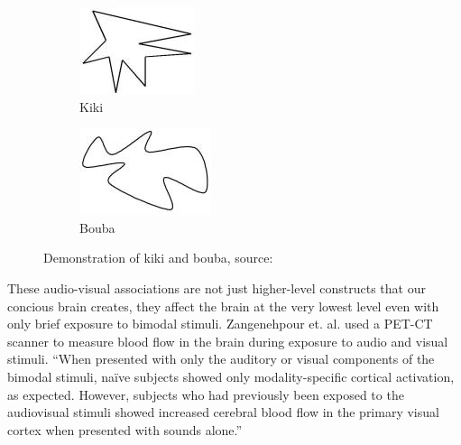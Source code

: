 \begin{figure}[ht]
\centering
\begin{subfigure}{.5\textwidth}
  \centering
  \includegraphics[width=0.7\linewidth]{figs/kiki.png}
  \caption{Kiki}
  \label{fig:kiki}
\end{subfigure}%
\begin{subfigure}{.5\textwidth}
  \centering
  \includegraphics[width=0.7\linewidth]{figs/bouba.png}
  \caption{Bouba}
  \label{fig:bouba}
\end{subfigure}
  \caption{Demonstration of kiki and bouba, source: \citep{Ramachandran2001}}
  \label{fig:boubakiki}
\end{figure}

These audio-visual associations are not just higher-level constructs that our
concious brain creates, they affect the brain at the very lowest level even
with only brief exposure to bimodal stimuli. Zangenehpour et. al.
\citep{Zangenehpour2010} used a PET-CT scanner to measure blood flow in the
brain during exposure to audio and visual stimuli. ``When presented with only
the auditory or visual components of the bimodal stimuli, na\"{i}ve subjects
showed only modality-specific cortical activation, as expected.  However,
subjects who had previously been exposed to the audiovisual stimuli showed
increased cerebral blood flow in the primary visual cortex when presented with
sounds alone.''

